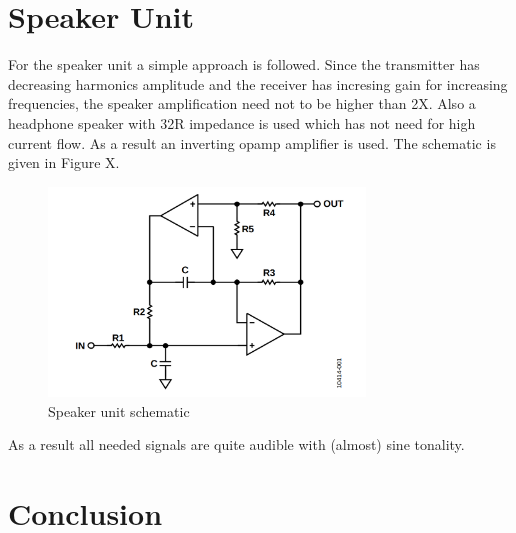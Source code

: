 \documentclass[letterpaper,12pt]{article}
\begin{document}
\section{Speaker Unit}
For the speaker unit a simple approach is followed. Since the transmitter has decreasing harmonics amplitude and the receiver has incresing gain for increasing frequencies, the speaker amplification need not to be  higher than 2X. Also a headphone speaker with 32R impedance is used which has not need for high current flow. As a result an inverting opamp amplifier is used. The schematic is given in Figure X.
\begin{figure}[H]
    \centering
    \includegraphics[width = 0.75\textwidth]{dualopamp.png}
    \caption{Speaker unit schematic}
\end{figure}
As a result all needed signals are quite audible with (almost) sine tonality. 
\section{Conclusion}
\end{document}
